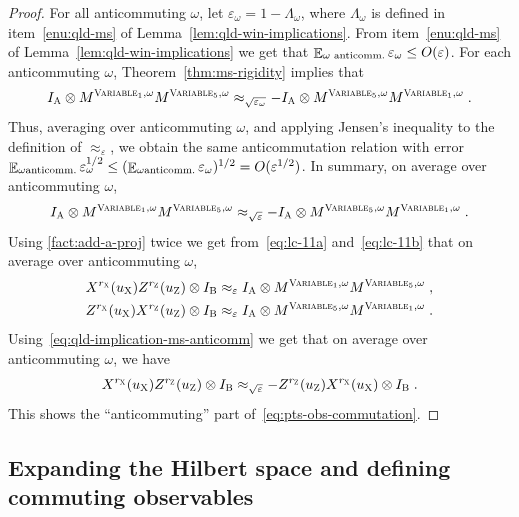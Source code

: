 \documentclass[11pt]{article}
\theoremstyle{definition}
\newcommand{\Id}{\ensuremath{I}}
\newcommand{\eps}{\varepsilon}
\newcommand{\E}{\mathop{\mathbb{E}}\displaylimits}
\newcommand{\labelstyle}[1]{\ensuremath{\textsc{#1}}\xspace}
\newcommand{\xpt}{\labelstyle{X}}
\newcommand{\zpt}{\labelstyle{Z}}
\newcommand{\alice}{\labelstyle{A}}
\newcommand{\bob}{\labelstyle{B}}
\newcommand{\typestyle}[1]{\ensuremath{\textsc{#1}}\xspace}
\newcommand{\Variable}{\typestyle{Variable}}
\begin{document}
\begin{proof}
For all anticommuting $\omega$, let $\eps_\omega = 1 -
\Lambda_\omega$, where $\Lambda_\omega$ is defined in
item~\ref{enu:qld-ms} of Lemma~\ref{lem:qld-win-implications}. From
item~\ref{enu:qld-ms} of Lemma~\ref{lem:qld-win-implications} we get
that $\E_{\omega \text{ anticomm.}} \eps_\omega \leq
O(\eps)$. For each anticommuting $\omega$,
Theorem~\ref{thm:ms-rigidity} implies that
\[ \Id_\alice \otimes M^{\Variable_1,\omega} M^{\Variable_5,\omega}
  \approx_{\sqrt{\eps_\omega}} -\Id_\alice \otimes M^{\Variable_5,\omega}
  M^{\Variable_1,\omega}\;. \]
Thus, averaging over anticommuting $\omega$, and applying Jensen's
inequality to the definition of $\approx_{\eps}$, we obtain the same
anticommutation relation with error $ \E_{\omega \text{anticomm.}}
\eps_{\omega}^{1/2} \leq (\E_{\omega \text{anticomm.}}
\eps_\omega)^{1/2} = O(\eps^{1/2})$. In summary, on average over anticommuting $\omega$, 
\begin{equation}
\label{eq:qld-implication-ms-anticomm}
\Id_\alice \otimes M^{\Variable_1,\omega} M^{\Variable_5,\omega} \approx_{\sqrt{\eps}} -\Id_\alice \otimes M^{\Variable_5,\omega} M^{\Variable_1,\omega}\;.
\end{equation}
Using \ref{fact:add-a-proj} twice we get from~\eqref{eq:lc-11a} and~\eqref{eq:lc-11b} that on average over anticommuting $\omega$,
\begin{gather}
	X^{r_\xpt}(u_\xpt) Z^{r_\zpt}(u_\zpt) \otimes \Id_\bob \approx_\eps \Id_\alice \otimes M^{\Variable_1,\omega}  M^{\Variable_5,\omega}\;, \\
	Z^{r_\xpt}(u_\xpt) X^{r_\zpt}(u_\zpt) \otimes \Id_\bob \approx_\eps \Id_\alice \otimes M^{\Variable_5,\omega}  M^{\Variable_1,\omega}\;.
\end{gather}
Using~\eqref{eq:qld-implication-ms-anticomm} we get that on average over anticommuting $\omega$, we have
\[
X^{r_\xpt}(u_\xpt) Z^{r_\zpt}(u_\zpt) \otimes \Id_\bob \approx_{\sqrt{\eps}} - Z^{r_\zpt}(u_\zpt)X^{r_\xpt}(u_\xpt)  \otimes \Id_\bob\;.
\]
This shows the ``anticommuting'' part of~\eqref{eq:pts-obs-commutation}.
\end{proof}

\subsection{Expanding the Hilbert space and defining commuting observables}
\label{sec:expanding}
\end{document}

